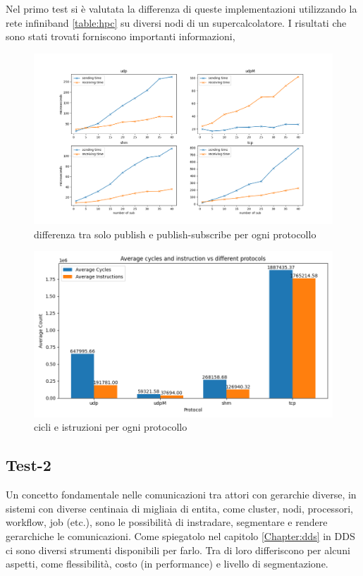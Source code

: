 Nel primo test si è valutata la differenza di queste implementazioni utilizzando la rete infiniband \ref{table:hpc} su diversi nodi di un supercalcolatore. I risultati che sono stati trovati forniscono importanti informazioni, %

\begin{figure}[H]
    \includegraphics[width=\textwidth]{./results/test3_different_protocol_send_receive.png} 
        \caption{differenza tra solo publish e publish-subscribe per ogni protocollo}
        \label{fig:test3_different_protocols}
\end{figure}

\begin{figure}[H]
    \includegraphics[width=\textwidth]{./results/test1_cyclinstr.png} 
        \caption{cicli e istruzioni per ogni protocollo}
        \label{fig:test3_different_protocols}
\end{figure}

\subsection{Test-2}
Un concetto fondamentale nelle comunicazioni tra attori con gerarchie diverse, in sistemi con diverse centinaia di migliaia di entita, come cluster, nodi, processori, workflow, job (etc.), sono le possibilità di instradare, segmentare e rendere gerarchiche le comunicazioni. Come spiegatolo nel capitolo \ref{Chapter:dds} in DDS ci sono diversi strumenti disponibili per farlo. Tra di loro differiscono per alcuni aspetti, come flessibilità, costo (in performance) e livello di segmentazione.

